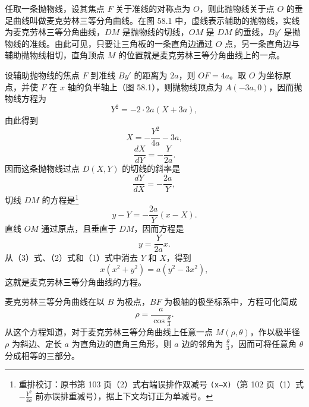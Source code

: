 \begin{minipage}[c]{0.55\textwidth}
  \hspace*{2em}任取一条抛物线，设其焦点 $F$ 关于准线的对称点为 $O$，则此抛物线关于点 $O$ 的垂足曲线叫做麦克劳林三等分角曲线。在图 58.1 中，虚线表示辅助的抛物线，实线为麦克劳林三等分角曲线，$DM$ 是抛物线的切线，$OM$ 是 $DM$ 的垂线，$By'$ 是抛物线的准线。由此可见，只要让三角板的一条直角边通过 $O$ 点，另一条直角边与辅助抛物线相切，直角顶点 $M$ 的位置就是麦克劳林三等分角曲线上的一点。
\end{minipage}

设辅助抛物线的焦点 $F$ 到准线 $By'$ 的距离为 $2a$，则 $OF = 4a$。取 $O$ 为坐标原点，并使 $F$ 在 $x$ 轴的负半轴上（图 58.1），则抛物线顶点为 $A(-3a, 0)$，因而抛物线方程为
\[
  Y^2 = -2\cdot 2a(X + 3a),
\]
由此得到
\begin{equation*}
  X = -\frac{Y^2}{4a} - 3a, \tag{1}
\end{equation*}
\[
  \frac{dX}{dY} = -\frac{Y}{2a}.
\]
因而这条抛物线过点 $D(X,Y)$ 的切线的斜率是
\[
  \frac{dY}{dX} = -\frac{2a}{Y},
\]
切线 $DM$ 的方程是\footnote{重排校订：原书第 103 页（2）式右端误排作双减号 \texttt{(x--X)}（第 102 页（1）式 $-\frac{Y^2}{4a}$ 前亦误排重减号），据上下文均订正为单减号。}
\begin{equation*}
  y - Y = -\frac{2a}{Y}(x - X). \tag{2}
\end{equation*}
直线 $OM$ 通过原点，且垂直于 $DM$，因而方程是
\begin{equation*}
  y = \frac{Y}{2a}x. \tag{3}
\end{equation*}
从（3）式、（2）式和（1）式中消去 $Y$ 和 $X$，得到
\[
  x(x^2 + y^2) = a(y^2 - 3x^2),
\]
这就是麦克劳林三等分角曲线的方程。

麦克劳林三等分角曲线在以 $B$ 为极点，$BF$ 为极轴的极坐标系中，方程可化简成
\[
  \rho = \frac{a}{\cos\frac{\theta}{3}}.
\]
从这个方程知道，对于麦克劳林三等分角曲线上任意一点 $M(\rho,\theta)$，作以极半径 $\rho$ 为斜边、定长 $a$ 为直角边的直角三角形，则 $a$ 边的邻角为 $\frac{\theta}{3}$，因而可将任意角 $\theta$ 分成相等的三部分。
